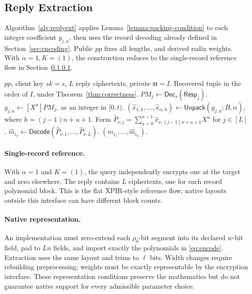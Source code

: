 \subsection{Reply Extraction}
\label{sec:unpack}
Algorithm~\ref{alg:replyext} applies Lemma~\ref{lemma:packing-condition} to
each integer coefficient \(y_{j,u}\), then uses the record decoding already
defined in Section~\ref{sec:encoding}. Public \(pp\) fixes all lengths,
and derived radix weights. With \(\alpha=1,K=(1)\), the construction reduces to
the single-record reference flow in Section~\ref{sec:xpir-baseline}.
\begin{algorithm}[t]
\caption{Reply Extraction \(\mathsf{ReplyExt}(pp,sk,\mathsf{Resp},\mathsf{st})\)}
\label{alg:replyext}
\begin{algorithmic}[1]
\Require \(pp\), client key \(sk=s\), \(L\) reply ciphertexts, private \(\mathsf{st}=I\).
\Ensure Recovered tuple in the order of \(I\), under Theorem~\ref{thm:correctness}.
 \State \(PM_j\gets\mathsf{Dec}_s(\mathsf{Resp}_j)\).
  \State \(y_{j,u}\gets[X^u]PM_j\), as an integer in \([0,t)\).
  \State \((\hat x_{1,h},\ldots,\hat x_{\alpha,h})\gets
   \mathsf{Unpack}(y_{j,u};B,\alpha)\), where \(h=(j-1)n+u+1\).
 \EndFor
\EndFor
{}
 \State Form \(\hat P_{\nu,j}=\sum_{u=0}^{n-1}\hat x_{\nu,(j-1)n+u+1}X^u\) for \(j\in[L]\).
 \State \(\hat m_{i_{\nu}}\gets\mathsf{Decode}(\hat P_{\nu,1},\ldots,\hat P_{\nu,L})\).
\EndFor
\State \Return \((\hat m_{i_1},\ldots,\hat m_{i_\alpha})\).
\end{algorithmic}
\end{algorithm}

\paragraph{Single-record reference.}
\label{sec:xpir-baseline}
With \(\alpha=1\) and \(K=(1)\), the query independently encrypts one at
the target and zero elsewhere. The reply contains \(L\) ciphertexts,
one for each record polynomial block. This is the flat XPIR-style
reference flow; native layouts outside this interface can have different
block counts.

\paragraph{Native representation.}
\label{sec:adapter}
An implementation must zero-extend each \(\rho_0\)-bit segment into its
declared \(w\)-bit field, pad to \(Ln\) fields, and import exactly the
polynomials in \eqref{eq:encode}. Extraction uses the same layout and
trims to \(\ell\) bits. Width changes require rebuilding preprocessing;
weights must be exactly representable by the encryption interface.
These representation conditions preserve the mathematics but do not
guarantee native support for every admissible parameter choice.
